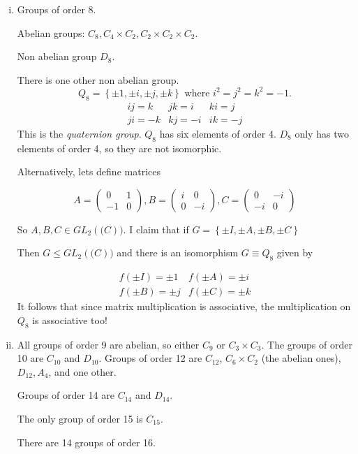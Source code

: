 \documentclass{article}
\theoremstyle{definition} \newtheorem*{definition}{Definition}
\begin{document}
\begin{enumerate}[(i)]
\item Groups of order 8.

  Abelian groups: $C_8,C_4\times C_2, C_2 \times C_2 \times C_2.$ 

  Non abelian group $D_8$.

  There is one other non abelian group.  \begin{equation*} Q_8 = \left\{ \pm1,
    \pm i, \pm j, \pm k \right\} \text{ where } i^2=j^2=k^2=-1.  \label{}
  \end{equation*} \begin{equation*} \begin{matrix} ij=k & jk=i & ki=j \\ ji=-k
      & kj=-i & ik=-j \end{matrix} \end{equation*} This is the \emph{quaternion
  group}.  $Q_8$ has six elements of order 4.  $D_8$ only has two elements of
  order 4, so they are not isomorphic.

  Alternatively, lets define matrices

  \begin{equation*} A = \left( \begin{matrix} 0 & 1 \\ -1 & 0 \end{matrix}
    \right), B = \left( \begin{matrix} i & 0 \\ 0 & -i \end{matrix} \right), C
    = \left( \begin{matrix} 0 & -i \\ -i & 0 \end{matrix} \right) \label{}
  \end{equation*}

  So $A,B,C \in GL_2(\mathbb(C))$. I claim that if $G = \left\{ \pm I, \pm A,
  \pm B, \pm C \right\}$

  Then $G \leq GL_2(\mathbb(C))$ and there is an isomorphism $G \equiv Q_8$
  given by 

  \begin{equation*} \begin{matrix} f(\pm I ) = \pm 1 & f(\pm A) = \pm i \\
      f(\pm B ) = \pm j & f(\pm C ) = \pm k \end{matrix} \label{}
  \end{equation*} It follows that since matrix multiplication is associative,
  the multiplication on $Q_8$ is associative too!

\item All groups of order 9 are abelian, so either $C_9$ or $C_3 \times C_3$.
  The groups of order 10 are $C_{10}$ and $D_{10}$. Groups of order 12 are
  $C_{12}$, $ C_{6} \times C_2$ (the abelian ones), $D_{12},A_{4}$, and one
  other. 

  Groups of order 14 are $C_{14}$ and $D_{14}$. 

  The only group of order 15 is $C_{15}$.

  There are 14 groups of order 16.  \end{enumerate}
\end{document}
